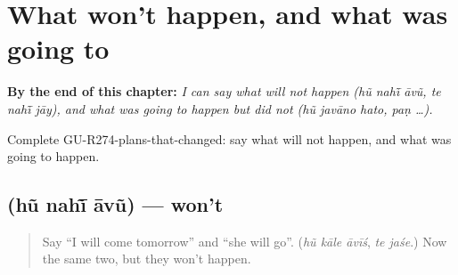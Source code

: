 
\chapter{What won't happen, and what was going to}
\label{ch:gu-what-won-t-happen-and-what-was-going-to}

\begin{chapteropening}
\textbf{By the end of this chapter:} \emph{I can say what will not happen (hũ nahī̃ āvũ, te nahī̃ jāy), and what was going to happen but did not (hũ javāno hato, paṇ …).}

Complete GU-R274-plans-that-changed: say what will not happen, and what was going to happen.
\end{chapteropening}

\section[\texorpdfstring{\gu{હું} \gu{નહીં} \gu{આવું} (hũ nahī̃ āvũ)}{હું નહીં આવું (hũ nahī̃ āvũ)}]{   (hũ nahī̃ āvũ) — won't}

\label{lesson:GU-C274-nahi-avu}



\begin{quote}
Say \textquotedblleft{}I will come tomorrow\textquotedblright{} and \textquotedblleft{}she will go\textquotedblright{}. (\emph{hũ kāle āvīś}, \emph{te jaśe}.) Now the same two, but they won't happen.
\end{quote}

